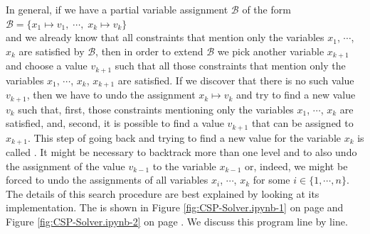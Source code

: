 In general, if we have a partial variable assignment $\mathcal{B}$ of the form
\\[0.2cm]
\hspace*{1.3cm}
$\mathcal{B} = \{ x_1 \mapsto v_1,\; \cdots,\; x_k \mapsto v_k \}$
\\[0.2cm]
and we already know that all constraints that mention only the variables $x_1$, $\cdots$, $x_k$ are satisfied
by $\mathcal{B}$, then in order to extend $\mathcal{B}$ we pick another variable $x_{k+1}$ and choose a
value $v_{k+1}$ such that all those constraints that mention only the variables  $x_1$, $\cdots$, $x_k$,
$x_{k+1}$ are satisfied.  If we discover that there is no such value $v_{k+1}$, then we have to undo the
assignment $x_k \mapsto v_k$ and try to find a new value $v_k$ such that, first, those constraints mentioning only 
the variables  $x_1$, $\cdots$, $x_k$ are satisfied, and, second, it is possible to find a value $v_{k+1}$ that
can be assigned to $x_{k+1}$.  This step of going back and trying to find a new value for the variable $x_k$ is
called .  It might be necessary to backtrack more than one level and to also undo the
assignment of the value $v_{k-1}$ to the variable $x_{k-1}$ or, indeed, we might be forced to undo the
assignments of all variables $x_i$, $\cdots$, $x_k$ for some $i \in \{1,\cdots, n\}$.  The details of this
search procedure are best explained by looking at its implementation.  The 
is shown in  Figure \ref{fig:CSP-Solver.ipynb-1} on page \pageref{fig:CSP-Solver.ipynb-1} and Figure
\ref{fig:CSP-Solver.ipynb-2} on page \pageref{fig:CSP-Solver.ipynb-2}.  We discuss this program line by line.

